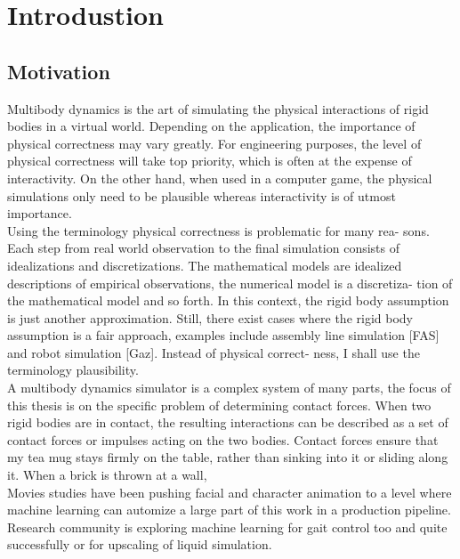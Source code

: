 \chapter{Introdustion}

\section{Motivation}
    Multibody dynamics is the art of simulating the physical interactions of rigid bodies in a virtual world. Depending on the application, the importance of physical correctness may vary greatly. For engineering purposes, the level of physical correctness will take top priority, which is often at the expense of interactivity. On the other hand, when used in a computer game, the physical simulations only need to be plausible whereas interactivity is of utmost importance. \\

    Using the terminology physical correctness is problematic for many rea- sons. Each step from real world observation to the final simulation consists of idealizations and discretizations. The mathematical models are idealized descriptions of empirical observations, the numerical model is a discretiza- tion of the mathematical model and so forth. In this context, the rigid body assumption is just another approximation. Still, there exist cases where the rigid body assumption is a fair approach, examples include assembly line simulation [FAS] and robot simulation [Gaz]. Instead of physical correct- ness, I shall use the terminology plausibility.\\

    A multibody dynamics simulator is a complex system of many parts, the focus of this thesis is on the specific problem of determining contact forces. When two rigid bodies are in contact, the resulting interactions can be described as a set of contact forces or impulses acting on the two bodies. Contact forces ensure that my tea mug stays firmly on the table, rather than sinking into it or sliding along it. When a brick is thrown at a wall,\\

    Movies studies have been pushing facial and character animation to a level where machine learning can  automize a large part of this work in a production pipeline. Research community is exploring machine learning for gait control too and quite successfully or for upscaling of liquid simulation\cite{CNNFluid2016}. \\

